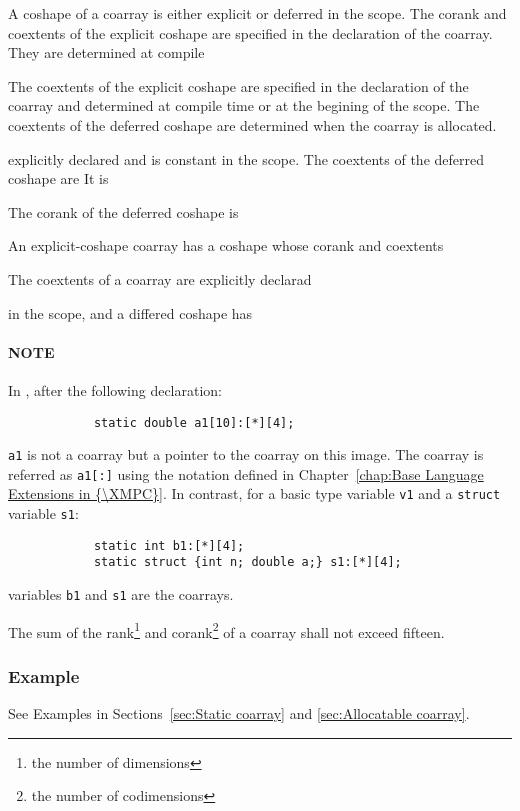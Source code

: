 A coshape of a coarray is either explicit or deferred in the scope.
%
The corank and coextents of the explicit coshape
are specified in the declaration of the coarray.
They are determined at compile 

The coextents of the explicit coshape are specified in the declaration of
the coarray and determined at compile time or at the begining of the scope.
%
The coextents of the deferred coshape are determined when the coarray 
is allocated. 


explicitly declared 
and is constant in the scope.
The coextents of the deferred coshape are 
It is 


The corank of the deferred coshape is 

An explicit-coshape coarray has a coshape whose corank and coextents 

The coextents of a coarray are explicitly declarad 

 in the scope, and
a differed coshape has 





\paragraph*{NOTE}
In {\XMPC}, after the following declaration:
\begin{verbatim}
            static double a1[10]:[*][4];
\end{verbatim}
{\tt a1} is not a coarray but a pointer to the coarray on this image.
The coarray is referred as {\tt a1[:]} using the notation defined in 
Chapter~\ref{chap:Base Language Extensions in {\XMPC}}.
In contrast, for a basic type variable {\tt v1} and a {\tt struct} 
variable {\tt s1}:
\begin{verbatim}
            static int b1:[*][4];
            static struct {int n; double a;} s1:[*][4];
\end{verbatim}
variables {\tt b1} and {\tt s1} are the coarrays.



\begin{Restriction}
\item 
The sum of the rank\footnote{the number of dimensions} and 
corank\footnote{the number of codimensions} of a coarray 
shall not exceed fifteen.

\end{Restriction}

\subsubsection*{Example}
See Examples in Sections~\ref{sec:Static coarray} and 
\ref{sec:Allocatable coarray}.


